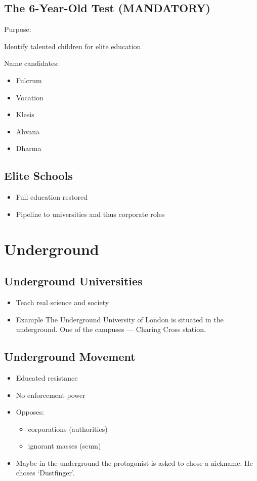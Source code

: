 \documentclass[12pt]{article}
\begin{document}
\subsection{The 6-Year-Old Test (MANDATORY)}

Purpose:

Identify talented children for elite education

Name candidates:
\begin{itemize}
  \item Fulcrum
  \item Vocation
  \item Klesis
  \item Ahvana
  \item Dharma
\end{itemize}

\subsection{Elite Schools}

\begin{itemize}
  \item Full education restored
  \item Pipeline to universities and thus corporate roles
\end{itemize}

\section{Underground}

\subsection{Underground Universities}

\begin{itemize}
  \item Teach real science and society
  \item Example The Underground University of London is situated in the underground. One of the campuses — Charing Cross station.
\end{itemize}

\subsection{Underground Movement}

\begin{itemize}
  \item Educated resistance
  \item No enforcement power
  \item Opposes:
  \begin{itemize}
    \item corporations (authorities)
    \item ignorant masses (scum)
  \end{itemize}
  \item Maybe in the underground the protagonist is asked to chose a nickname. He choses ‘Dustfinger’.
\end{itemize}
\end{document}
